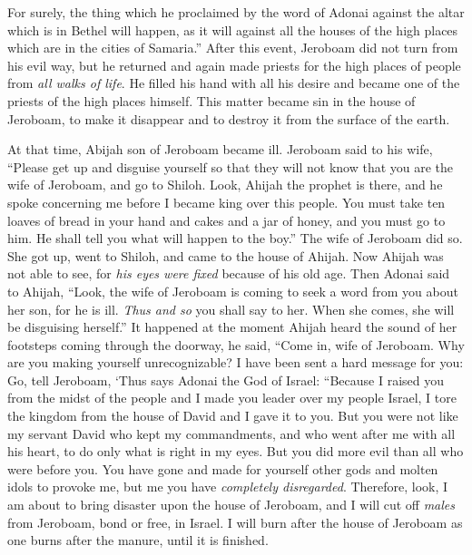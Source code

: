 \begin{biblechapter}
\verse For surely, the thing which he proclaimed by the word of Adonai against the altar which is in Bethel will happen, as it will against all the houses of the high places which are in the cities of Samaria.”
 After this event, Jeroboam did not turn from his evil way, but he returned and again made priests for the high places of people from \textit{all walks of life}. He filled his hand with all his desire and became one of the priests of the high places himself.
\verse This matter became sin in the house of Jeroboam, to make it disappear and to destroy it from the surface of the earth.
\end{biblechapter}

\begin{biblechapter} %
 At that time, Abijah son of Jeroboam became ill.
\verse Jeroboam said to his wife, “Please get up and disguise yourself so that they will not know that you are the wife of Jeroboam, and go to Shiloh. Look, Ahijah the prophet is there, and he spoke concerning me before I became king over this people.
\verse You must take ten loaves of bread in your hand and cakes and a jar of honey, and you must go to him. He shall tell you what will happen to the boy.”
\verse The wife of Jeroboam did so. She got up, went to Shiloh, and came to the house of Ahijah. Now Ahijah was not able to see, for \textit{his eyes were fixed} because of his old age.
\verse Then Adonai said to Ahijah, “Look, the wife of Jeroboam is coming to seek a word from you about her son, for he is ill. \textit{Thus and so} you shall say to her. When she comes, she will be disguising herself.”
\verse It happened at the moment Ahijah heard the sound of her footsteps coming through the doorway, he said, “Come in, wife of Jeroboam. Why are you making yourself unrecognizable? I have been sent a hard message for you:
\verse Go, tell Jeroboam, ‘Thus says Adonai the God of Israel: “Because I raised you from the midst of the people and I made you leader over my people Israel,
\verse I tore the kingdom from the house of David and I gave it to you. But you were not like my servant David who kept my commandments, and who went after me with all his heart, to do only what is right in my eyes.
\verse But you did more evil than all who were before you. You have gone and made for yourself other gods and molten idols to provoke me, but me you have \textit{completely disregarded}.
\verse Therefore, look, I am about to bring disaster upon the house of Jeroboam, and I will cut off \textit{males} from Jeroboam, bond or free, in Israel. I will burn after the house of Jeroboam as one burns after the manure, until it is finished.

\end{biblechapter}
